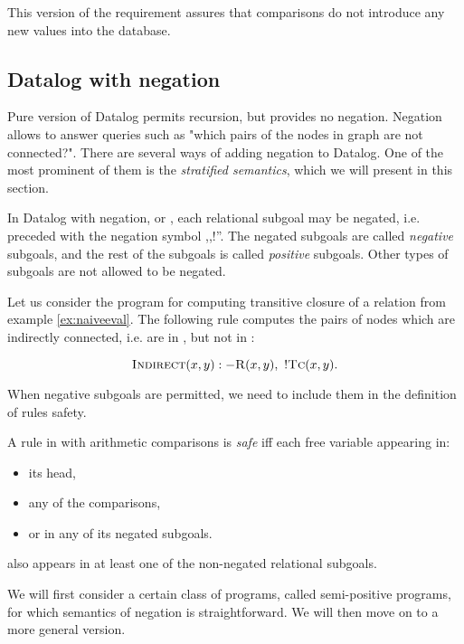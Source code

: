 This version of the requirement assures that comparisons do not introduce any new values into the database.

\subsection{Datalog with negation}\label{ss:datalogneg}
Pure version of Datalog permits recursion, but provides no negation. Negation allows to answer queries such as "which pairs of the nodes in graph are not connected?". There are several ways of adding negation to Datalog. One of the most prominent of them is the \emph{stratified semantics}, which we will present in this section. 

In Datalog with negation, or \datalogneg, each relational subgoal may be negated, i.e. preceded with the negation symbol ,,$!$''. The negated subgoals are called \emph{negative} subgoals, and the rest of the subgoals is called \emph{positive} subgoals. Other types of subgoals are not allowed to be negated.

\begin{exmp}
Let us consider the program for computing transitive closure  of a relation  from example \ref{ex:naiveeval}. The following rule computes the pairs of nodes which are indirectly connected, i.e. are in , but not in :

$$\textsc{Indirect}(x, y) :- \textsc{R}(x, y),~!\textsc{Tc}(x, y).$$
\end{exmp}

When negative subgoals are permitted, we need to include them in the definition of rules safety. 

\begin{defn}\label{d:datalognegsaferule}
A rule in \datalogneg with arithmetic comparisons is \emph{safe} iff each free variable appearing in:
\begin{itemize}
\item its head,
\item any of the comparisons,
\item or in any of its negated subgoals.
\end{itemize}
also appears in at least one of the non-negated relational subgoals.
\end{defn}

We will first consider a certain class of \datalogneg programs, called semi-positive programs, for which semantics of negation is straightforward. We will then move on to a more general version.

